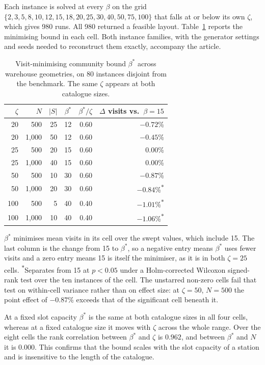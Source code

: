\documentclass[11pt]{article}
\newcommand{\tbl}[1]{\caption{#1}}
\newcommand{\tabnote}[1]{\vspace{2pt}\footnotesize\raggedright #1\par}
\begin{document}
Each instance is solved at every $\beta$ on the grid
$\{2,3,5,8,10,12,15,18,20,25,30,40,50,75,100\}$ that falls at or below its own $\zeta$, which
gives 980 runs. All 980 returned a feasible layout. Table~\ref{tab:capsweep} reports the
minimising bound in each cell. Both instance families, with the generator settings and seeds
needed to reconstruct them exactly, accompany the article.

\begin{table}[H]
\centering
\tbl{Visit-minimising community bound $\beta^\ast$ across warehouse geometries, on 80 instances disjoint from the benchmark. The same $\zeta$ appears at both catalogue sizes.}
{\small\begin{tabular*}{\textwidth}{@{\extracolsep{\fill}}rrrrrr@{}}
\toprule
$\zeta$ & $N$ & $|S|$ & $\beta^\ast$ & $\beta^\ast/\zeta$ & $\Delta$ visits vs.\ $\beta=15$ \\
\midrule
20  & 500   & 25 & 12 & 0.60 & $-0.72$\% \\
20  & 1{,}000 & 50 & 12 & 0.60 & $-0.45$\% \\
25  & 500   & 20 & 15 & 0.60 & $0.00$\% \\
25  & 1{,}000 & 40 & 15 & 0.60 & $0.00$\% \\
50  & 500   & 10 & 30 & 0.60 & $-0.87$\% \\
50  & 1{,}000 & 20 & 30 & 0.60 & $-0.84$\%\textsuperscript{$\ast$} \\
100 & 500   & 5  & 40 & 0.40 & $-1.01$\%\textsuperscript{$\ast$} \\
100 & 1{,}000 & 10 & 40 & 0.40 & $-1.06$\%\textsuperscript{$\ast$} \\
\bottomrule
\end{tabular*}}
\tabnote{$\beta^\ast$ minimises mean visits in its cell over the swept values, which include 15. The last column is the change from 15 to $\beta^\ast$, so a negative entry means $\beta^\ast$ uses fewer visits and a zero entry means 15 is itself the minimiser, as it is in both $\zeta=25$ cells. \textsuperscript{$\ast$}Separates from 15 at $p<0.05$ under a Holm-corrected Wilcoxon signed-rank test over the ten instances of the cell. The unstarred non-zero cells fail that test on within-cell variance rather than on effect size: at $\zeta=50$, $N=500$ the point effect of $-0.87$\% exceeds that of the significant cell beneath it.}
\label{tab:capsweep}
\end{table}

At a fixed slot capacity $\beta^\ast$ is the same at both catalogue sizes in all four cells,
whereas at a fixed catalogue size it moves with $\zeta$ across the whole range. Over the eight
cells the rank correlation between $\beta^\ast$ and $\zeta$ is $0.962$, and between
$\beta^\ast$ and $N$ it is $0.000$. This confirms that the bound scales with the slot capacity
of a station and is insensitive to the length of the catalogue.
\end{document}
